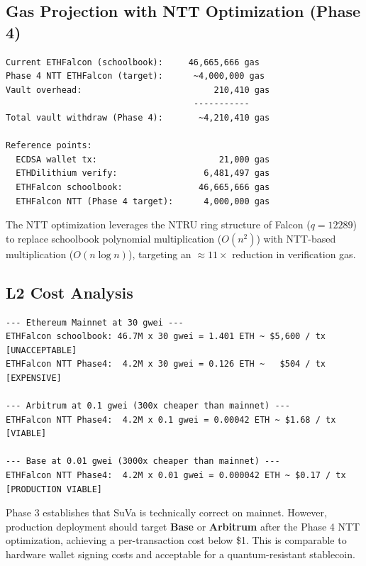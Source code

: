 \documentclass[11pt,a4paper]{article}
\begin{document}
\subsection{Gas Projection with NTT Optimization (Phase 4)}

\begin{lstlisting}[style=bash, caption={Phase 4 gas projection}]
Current ETHFalcon (schoolbook):     46,665,666 gas
Phase 4 NTT ETHFalcon (target):      ~4,000,000 gas
Vault overhead:                          210,410 gas
                                     -----------
Total vault withdraw (Phase 4):       ~4,210,410 gas

Reference points:
  ECDSA wallet tx:                        21,000 gas
  ETHDilithium verify:                 6,481,497 gas
  ETHFalcon schoolbook:               46,665,666 gas
  ETHFalcon NTT (Phase 4 target):      4,000,000 gas
\end{lstlisting}

The NTT optimization leverages the NTRU ring structure of Falcon ($q = 12289$) to replace schoolbook polynomial multiplication ($O(n^2)$) with NTT-based multiplication ($O(n \log n)$), targeting an $\approx 11\times$ reduction in verification gas.

\subsection{L2 Cost Analysis}

\begin{lstlisting}[style=bash, caption={L2 deployment cost projections (ETH = $4,000)}]
--- Ethereum Mainnet at 30 gwei ---
ETHFalcon schoolbook: 46.7M x 30 gwei = 1.401 ETH ~ $5,600 / tx  [UNACCEPTABLE]
ETHFalcon NTT Phase4:  4.2M x 30 gwei = 0.126 ETH ~   $504 / tx  [EXPENSIVE]

--- Arbitrum at 0.1 gwei (300x cheaper than mainnet) ---
ETHFalcon NTT Phase4:  4.2M x 0.1 gwei = 0.00042 ETH ~ $1.68 / tx  [VIABLE]

--- Base at 0.01 gwei (3000x cheaper than mainnet) ---
ETHFalcon NTT Phase4:  4.2M x 0.01 gwei = 0.000042 ETH ~ $0.17 / tx  [PRODUCTION VIABLE]
\end{lstlisting}

\begin{infobox}
Phase 3 establishes that SuVa is technically correct on mainnet. However, production deployment should target \textbf{Base} or \textbf{Arbitrum} after the Phase 4 NTT optimization, achieving a per-transaction cost below \$1. This is comparable to hardware wallet signing costs and acceptable for a quantum-resistant stablecoin.
\end{infobox}
\end{document}
